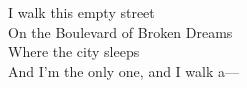 I walk this empty street \\
On the Boulevard of Broken Dreams \\
Where the city sleeps \\
And I'm the only one, and I walk a— 